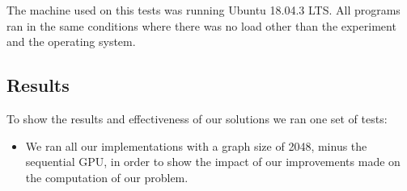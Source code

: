 \documentclass[conference]{IEEEtran}
\begin{document}
The machine used on this tests was running Ubuntu 18.04.3 LTS. All programs ran in the same conditions where there was no load other than the experiment and the operating system.

\subsection{Results}

To show the results and effectiveness of our solutions we ran one set of tests:
\begin{itemize}
	\item We ran all our implementations with a graph size of 2048, minus the sequential GPU, in order to show the impact of our improvements made on the computation of our problem.
\end{itemize}
\end{document}
